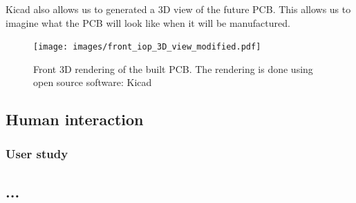 Kicad also allows us to generated a 3D view of the future PCB. This allows us to imagine what the
PCB will look like when it will be manufactured.
\begin{figure}[h]
    \centering
    \texttt{[image: images/front\_iop\_3D\_view\_modified.pdf]}
    \caption{Front 3D rendering of the built PCB. The rendering is done using open source software: Kicad} 
    \vspace{0.1cm}
    \label{fig:front_iop_3D_view_modified}
\end{figure}

\subsection{Human interaction}
\subsubsection{}
\subsubsection{User study}
\subsection{...}